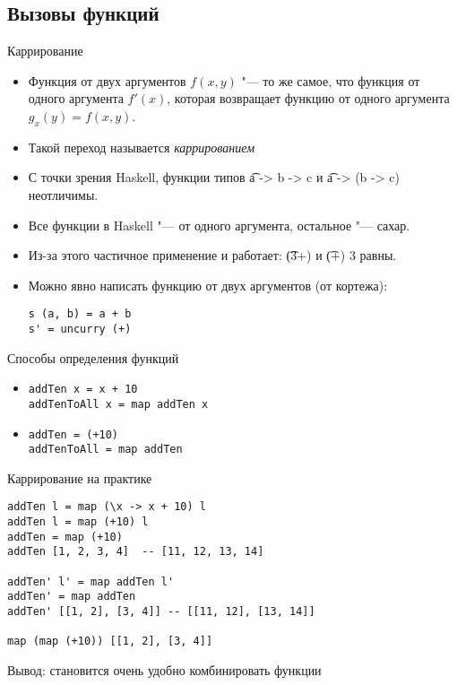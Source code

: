 \subsection{Вызовы функций}

\begin{frame}
\end{frame}

\begin{frame}[fragile]{Каррирование}
	\begin{itemize}
		\item Функция от двух аргументов $f(x, y)$ "--- то же самое, что функция от одного аргумента $f'(x)$,
			которая возвращает функцию от одного аргумента $g_x(y)=f(x, y)$.
		\item Такой переход называется \textit{каррированием}
		\item С точки зрения Haskell, функции типов \t{a -> b -> c} и \t{a -> (b -> c)} неотличимы.
		\item Все функции в Haskell "--- от одного аргумента, остальное "--- сахар.
		\item Из-за этого частичное применение и работает: \t{(3+)} и \t{(+) 3} равны.
		\item Можно явно написать функцию от двух аргументов (от кортежа):
\begin{verbatim}
s (a, b) = a + b
s' = uncurry (+)
\end{verbatim}
	\end{itemize}
\end{frame}

\begin{frame}[fragile]{Способы определения функций}
	\begin{itemize}
		\item
\begin{verbatim}
addTen x = x + 10
addTenToAll x = map addTen x
\end{verbatim}
		\item
\begin{verbatim}
addTen = (+10)
addTenToAll = map addTen
\end{verbatim}
	\end{itemize}
\end{frame}

\begin{frame}[fragile]{Каррирование на практике}
	\begin{verbatim}
addTen l = map (\x -> x + 10) l
addTen l = map (+10) l
addTen = map (+10)
addTen [1, 2, 3, 4]  -- [11, 12, 13, 14]

addTen' l' = map addTen l'
addTen' = map addTen
addTen' [[1, 2], [3, 4]] -- [[11, 12], [13, 14]]

map (map (+10)) [[1, 2], [3, 4]]
	\end{verbatim}
	Вывод: становится очень удобно комбинировать функции
\end{frame}

